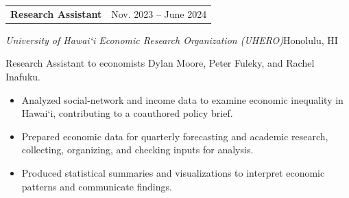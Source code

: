 \documentclass[10pt,letterpaper]{article}
\begin{document}
\vspace{4pt}
\begin{tabularx}{\linewidth}{@{}X r@{}}\textbf{Research Assistant} & {\small Nov. 2023 -- June 2024}\\\end{tabularx}
\emph{University of Hawai`i Economic Research Organization (UHERO)}\hfill {\small\color{muted}Honolulu, HI}\par
Research Assistant to economists Dylan Moore, Peter Fuleky, and Rachel Inafuku.\par
\begin{itemize}
\item Analyzed social-network and income data to examine economic inequality in Hawai`i, contributing to a coauthored policy brief.
\item Prepared economic data for quarterly forecasting and academic research, collecting, organizing, and checking inputs for analysis.
\item Produced statistical summaries and visualizations to interpret economic patterns and communicate findings.
\end{itemize}
\vspace{4pt}
\newpage
\end{document}
